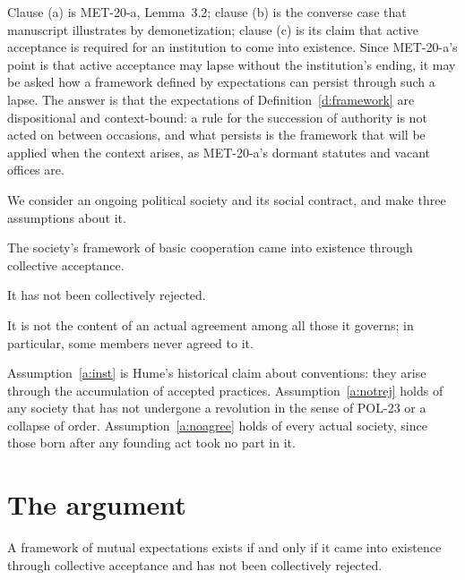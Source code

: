 \documentclass{situationist-preprint}
\begin{document}
Clause (a) is MET-20-a, Lemma~3.2; clause (b) is the converse case that manuscript illustrates by demonetization; clause (c) is its claim that active acceptance is required for an institution to come into existence. Since MET-20-a's point is that active acceptance may lapse without the institution's ending, it may be asked how a framework defined by expectations can persist through such a lapse. The answer is that the expectations of Definition~\ref{d:framework} are dispositional and context-bound: a rule for the succession of authority is not acted on between occasions, and what persists is the framework that will be applied when the context arises, as MET-20-a's dormant statutes and vacant offices are.

We consider an ongoing political society and its social contract, and make three assumptions about it.

\begin{assumption}\label{a:inst}
The society's framework of basic cooperation came into existence through collective acceptance.
\end{assumption}

\begin{assumption}\label{a:notrej}
It has not been collectively rejected.
\end{assumption}

\begin{assumption}\label{a:noagree}
It is not the content of an actual agreement among all those it governs; in particular, some members never agreed to it.
\end{assumption}

Assumption~\ref{a:inst} is Hume's historical claim about conventions: they arise through the accumulation of accepted practices. Assumption~\ref{a:notrej} holds of any society that has not undergone a revolution in the sense of POL-23 or a collapse of order. Assumption~\ref{a:noagree} holds of every actual society, since those born after any founding act took no part in it.

\section{The argument}

\begin{proposition}\label{p:iff}
A framework of mutual expectations exists if and only if it came into existence through collective acceptance and has not been collectively rejected.
\end{proposition}
\end{document}
